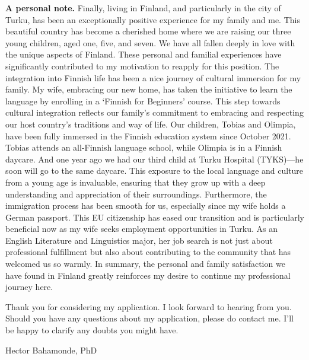 \documentclass[10pt,stdletter,dateno,sigleft]{newlfm} %
\begin{document}
\begin{newlfm}
{\bf A personal note.} Finally, living in Finland, and particularly in the city of Turku, has been an exceptionally positive experience for my family and me. This beautiful country has become a cherished home where we are raising our three young children, aged one, five, and seven. We have all fallen deeply in love with the unique aspects of Finland. These personal and familial experiences have significantly contributed to my motivation to reapply for this position. The integration into Finnish life has been a nice journey of cultural immersion for my family. My wife, embracing our new home, has taken the initiative to learn the language by enrolling in a `Finnish for Beginners' course. This step towards cultural integration reflects our family's commitment to embracing and respecting our host country's traditions and way of life. Our children, Tobias and Olimpia, have been fully immersed in the Finnish education system since October 2021. Tobias attends an all-Finnish language school, while Olimpia is in a Finnish daycare. And one year ago we had our third child at Turku Hospital (TYKS)---he soon will go to the same daycare. This exposure to the local language and culture from a young age is invaluable, ensuring that they grow up with a deep understanding and appreciation of their surroundings. Furthermore, the immigration process has been smooth for us, especially since my wife holds a German passport. This EU citizenship has eased our transition and is particularly beneficial now as my wife seeks employment opportunities in Turku. As an English Literature and Linguistics major, her job search is not just about professional fulfillment but also about contributing to the community that has welcomed us so warmly. In summary, the personal and family satisfaction we have found in Finland greatly reinforces my desire to continue my professional journey here.

Thank you for considering my application. I look forward to hearing from you. Should you have any questions about my application, please do contact me. I'll be happy to clarify any doubts you might have.




\vspace{3cm}

{\hspace{12cm}Hector Bahamonde, PhD}


\newpage

\printbibliography




\end{newlfm}
\end{document}
